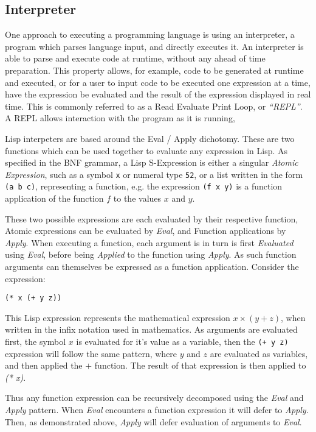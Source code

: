 \documentclass[11pt]{report}
\begin{document}
\subsection{Interpreter}
One approach to executing a programming language is using an interpreter, a program which parses language input, and directly executes it. An interpreter is able to parse and execute code at runtime, without any ahead of time preparation. This property allows, for example, code to be generated at runtime and executed, or for a user to input code to be executed one expression at a time, have the expression be evaluated and the result of the expression displayed in real time. This is commonly referred to as a Read Evaluate Print Loop, or \textit{``REPL''}. A REPL allows interaction with the program as it is running,  

Lisp interpeters are based around the Eval / Apply dichotomy. These are two functions which can be used together to evaluate any expression in Lisp. As specified in the BNF grammar, a Lisp S-Expression is either a singular \textit{Atomic Expression}, such as a symbol \texttt{x} or numeral type \texttt{52}, or a list written in the form \texttt{(a b c)}, representing a function, e.g. the expression \texttt{(f x y)} is a function application of the function $f$ to the values $x$ and $y$.

These two possible expressions are each evaluated by their respective function, Atomic expressions can be evaluated by \textit{Eval}, and Function applications by \textit{Apply}. When executing a function, each argument is in turn is first \textit{Evaluated} using \textit{Eval}, before being \textit{Applied} to the function using \textit{Apply}. As such function arguments can themselves be expressed as a function application. Consider the expression:

\texttt{(* x (+ y z))}

This Lisp expression represents the mathematical expression $x \times (y + z)$, when written in the infix notation used in mathematics. As arguments are evaluated first, the symbol $x$ is evaluated for it's value as a variable, then the \texttt{(+ y z)} expression will follow the same pattern, where $y$ and $z$ are evaluated as variables, and then applied the $+$ function. The result of that expression is then applied to \textit{(* x)}.

Thus any function expression can be recursively decomposed using the \textit{Eval} and \textit{Apply} pattern. When \textit{Eval} encounters a function expression it will defer to \textit{Apply}. Then, as demonstrated above, \textit{Apply} will defer evaluation of arguments to \textit{Eval}.
\end{document}
